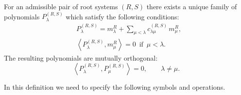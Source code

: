 \documentclass{article}
\begin{document}
For an admissible pair of root systems $(R,S)$   there exists a unique family of polynomials $P_{\lambda}^{(R,S)}$ which satisfy the following conditions:
\begin{align}
   & P_{\lambda}^{(R,S)} = m_{\lambda}^R +\sum_{\mu<\lambda} c_{\lambda\mu}^{(R,S)}\, m_{\mu}^R, \label{triangulardecomposition}\\
 &  \left \langle P_{\lambda}^{(R,S)},m_{\mu}^R  \right \rangle = 0 \,\,\, \text{if} \,\,\, \mu<\lambda. \label{orthogonality}
\end{align}
The resulting polynomials are mutually orthogonal:
\begin{equation}
\left  \langle P_{\lambda}^{(R,S)},P_{\mu}^{(R,S)}  \right \rangle = 0, \quad\quad \lambda \neq \mu.
\end{equation}

In this definition we need to specify the following symbols and operations.
\end{document}
